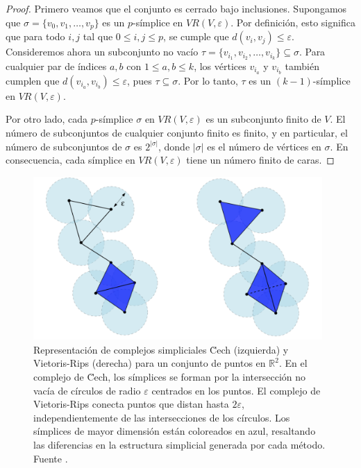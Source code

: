 \begin{proof}
	Primero veamos que el conjunto es cerrado bajo inclusiones. Supongamos que $\sigma = \{v_0, v_1, \dots, v_p\}$ es un $p$-símplice en $VR(V, \varepsilon)$. Por definición, esto significa que para todo $i, j$ tal que $0 \leq i, j \leq p$, se cumple que $d(v_i, v_j) \leq \varepsilon$. Consideremos ahora un subconjunto no vacío $\tau = \{v_{i_1}, v_{i_2}, \dots, v_{i_k}\} \subseteq \sigma$. Para cualquier par de índices $a, b$ con $1 \leq a, b \leq k$, los vértices $v_{i_a}$ y $v_{i_b}$ también cumplen que $d(v_{i_a}, v_{i_b}) \leq \varepsilon$, pues $\tau \subseteq \sigma$. Por lo tanto, $\tau$ es un $(k-1)$-símplice en $VR(V, \varepsilon)$.
	
	Por otro lado, cada $p$-símplice $\sigma$ en $VR(V, \varepsilon)$ es un subconjunto finito de $V$. El número de subconjuntos de cualquier conjunto finito es finito, y en particular, el número de subconjuntos de $\sigma$ es $2^{|\sigma|}$, donde $|\sigma|$ es el número de vértices en $\sigma$. En consecuencia, cada símplice en $VR(V, \varepsilon)$ tiene un número finito de caras.
\end{proof}

\begin{figure}
	\centering
	\includegraphics[width=110mm]{img/cech-vr.png}
	\caption{Representación de complejos simpliciales \u Cech (izquierda) y Vietoris-Rips (derecha) para un conjunto de puntos en \( \mathbb{R}^2 \). En el complejo de \u Cech, los símplices se forman por la intersección no vacía de círculos de radio \(\varepsilon\) centrados en los puntos. El complejo de Vietoris-Rips conecta puntos que distan hasta \(2\varepsilon\), independientemente de las intersecciones de los círculos. Los símplices de mayor dimensión están coloreados en azul, resaltando las diferencias en la estructura simplicial generada por cada método. Fuente \cite{chazal2021introduction}.}
\end{figure}

